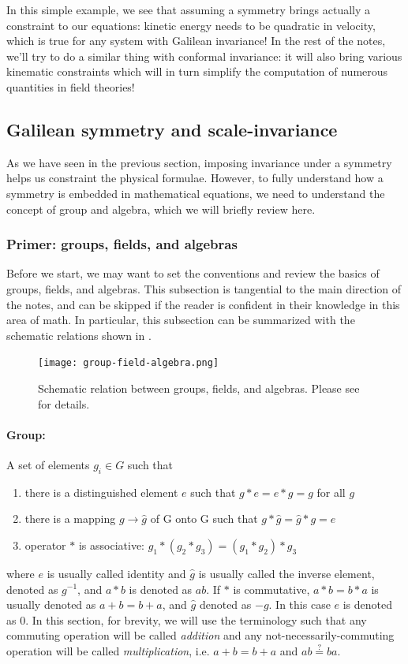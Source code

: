 \documentclass[12pt]{article}
\numberwithin{equation}{section}
\begin{document}
In this simple example, we see that assuming a symmetry brings actually a constraint to our equations: kinetic energy needs to be quadratic in velocity, which is true for any system with Galilean invariance! In the rest of the notes, we'll try to do a similar thing with conformal invariance: it will also bring various kinematic constraints which will in turn simplify the computation of numerous quantities in field theories! 

\subsection{Galilean  symmetry and scale-invariance}
As we have seen in the previous section, imposing invariance under a symmetry helps us constraint the physical formulae. However, to fully understand how a symmetry is embedded in mathematical equations, we need to understand the concept of group and algebra, which we will briefly review here.

\subsubsection{Primer: groups, fields, and algebras}
\label{sec: review of groups, fields, and algebras}
Before we start, we may want to set the conventions and review the basics of groups, fields, and algebras. This subsection is tangential to the main direction of the notes, and can be skipped if the reader is confident in their knowledge in this area of math. In particular, this subsection can be summarized with the schematic relations shown in \figref{\ref{fig: group-field-algebra}}.
\begin{figure}
	\centering 
	\texttt{[image: group-field-algebra.png]}
	\caption[Schematic relation between groups, fields, and algebras]{\label{fig: group-field-algebra} Schematic relation between groups, fields, and algebras. Please see \secref{\ref{sec: review of groups, fields, and algebras}} for details.}
\end{figure}

\paragraph{Group:} A set of elements $g_i \in G$ such that
\begin{enumerate}
	\item there is a distinguished element $e$ such that $g*e=e*g=g$ for all $g$
	\item there is a mapping $g\to \hat g$ of G onto G such that $g*\hat g=\hat g*g=e$
	\item operator $*$ is associative: $g_1*(g_2*g_3)=(g_1*g_2)*g_3$
\end{enumerate}
where $e$ is usually called identity and $\hat g$ is usually called the inverse element, denoted as $g^{-1}$, and $a*b$ is denoted as $a b$. If $*$ is commutative, $a*b=b*a$ is usually denoted as $a+b=b+a$, and $\hat g$ denoted as $-g$. In this case $e$ is denoted as $0$. In this section, for brevity, we will use the terminology such that any commuting operation will be called \emph{addition} and any  not-necessarily-commuting operation will be called \emph{multiplication}, i.e. $a+b=b+a$ and $ab\stackrel{?}{=}ba$.
\end{document}
